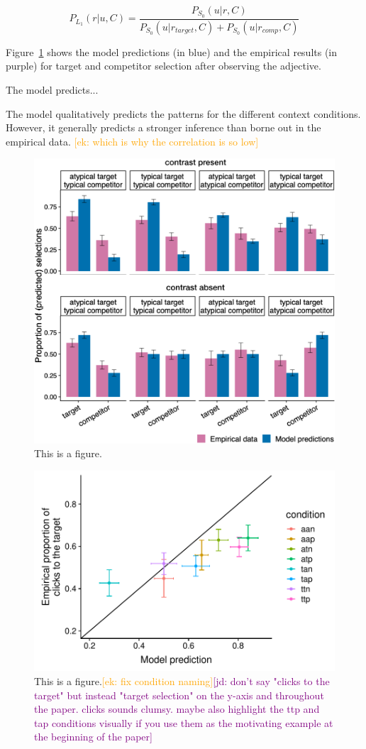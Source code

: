 \documentclass[10pt,letterpaper]{article}
\newcommand{\ek}[1]{\textcolor{Orange}{[ek: #1]}}
\newcommand{\jd}[1]{\textcolor{Purple}{[jd: #1]}}
\begin{document}
\begin{equation}
	P_{L_1}(r|u,C) = \frac{P_{S_0}(u|r,C)}{P_{S_0}(u|r_{target},C) + P_{S_0}(u|r_{comp},C)}
\label{eq-flatprior}
\end{equation}

Figure~\ref{model-results-flatprior} shows the model predictions (in blue) and the empirical results (in purple) for target and competitor selection after observing the adjective. 

The model predicts...

The model qualitatively predicts the patterns for the different context conditions. However, it generally predicts a stronger inference than borne out in the empirical data. \ek{which is why the correlation is so low}

\begin{figure}
	\begin{center}
		\includegraphics[width=.475\textwidth]{graphs/model-bycond-paper.pdf}
	\end{center}
\caption{This is a figure.} 
\label{model-results-flatprior}
\end{figure}

\begin{figure}
	\begin{center}
		\includegraphics[width=.475\textwidth]{graphs/corr-modelflat-bycondition.pdf}
	\end{center}
\caption{This is a figure.\ek{fix condition naming}\jd{don't say "clicks to the target" but instead "target selection" on the y-axis and throughout the paper. clicks sounds clumsy. maybe also highlight the ttp and tap conditions visually if you use them as the motivating example at the beginning of the paper}} 
\label{model-results-corr-flatprior}
\end{figure}
\end{document}
